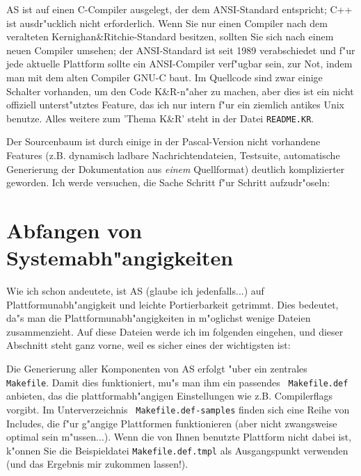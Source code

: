 \documentclass[12pt,a4paper,twoside]{report}
\begin{document}
AS ist auf einen C-Compiler ausgelegt, der dem ANSI-Standard entspricht;
C++ ist ausdr"ucklich nicht erforderlich.  Wenn Sie nur einen Compiler
nach dem veralteten Kernighan\&Ritchie-Standard besitzen, sollten Sie sich
nach einem neuen Compiler umsehen; der ANSI-Standard ist seit 1989
verabschiedet und f"ur jede aktuelle Plattform sollte ein ANSI-Compiler
verf"ugbar sein, zur Not, indem man mit dem alten Compiler GNU-C baut.  Im
Quellcode sind zwar einige Schalter vorhanden, um den Code K\&R-n"aher zu
machen, aber dies ist ein nicht offiziell unterst"utztes Feature, das ich
nur intern f"ur ein ziemlich antikes Unix benutze.  Alles weitere zum
'Thema K\&R' steht in der Datei {\tt README.KR}.

Der Sourcenbaum ist durch einige in der Pascal-Version nicht vorhandene
Features (z.B. dynamisch ladbare Nachrichtendateien, Testsuite,
automatische Generierung der Dokumentation aus {\em einem} Quellformat)
deutlich komplizierter geworden.  Ich werde versuchen, die Sache Schritt
f"ur Schritt aufzudr"oseln:


\section{Abfangen von Systemabh"angigkeiten}

Wie ich schon andeutete, ist AS (glaube ich jedenfalls...) auf
Plattformunabh"angigkeit und leichte Portierbarkeit getrimmt.  Dies
bedeutet, da"s man die Platt\-form\-un\-ab\-h"an\-gig\-kei\-ten in
m"oglichst wenige Dateien zusammenzieht.  Auf diese Dateien werde ich im
folgenden eingehen, und dieser Abschnitt steht ganz vorne, weil es sicher
eines der wichtigsten ist:

Die Generierung aller Komponenten von AS erfolgt "uber ein zentrales {\tt
Makefile}.  Damit dies funktioniert, mu"s man ihm ein passendes {\tt
Makefile.def} anbieten, das die plattformabh"angigen Einstellungen wie
z.B. Compilerflags vorgibt.  Im Unterverzeichnis {\tt
Makefile.def-samples} finden sich eine Reihe von Includes, die f"ur
g"angige Plattformen funktionieren (aber nicht zwangsweise optimal sein
m"ussen...).  Wenn die von Ihnen benutzte Plattform nicht dabei ist,
k"onnen Sie die Beispieldatei {\tt Makefile.def.tmpl} als Ausgangspunkt
verwenden (und das Ergebnis mir zukommen lassen!).
\end{document}
